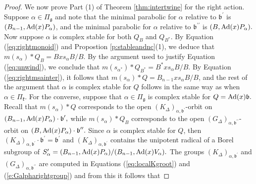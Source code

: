 \documentclass[12pt]{amsart}
\numberwithin{equation}{section}
\newcommand{\fk}{\mbox{${\mathfrak k}$}}
\newcommand{\fg}{\mbox{${\mathfrak g}$}}
\newcommand{\fb}{\mbox{${\mathfrak b}$}}
\newcommand{\Ad}{{\rm Ad}}
\newcommand{\ms}{m(s_{\alpha})}
\begin{document}
\begin{proof}
We now prove Part (1) of Theorem \ref{thm:intertwine} for the right action.  
Suppose $\alpha \in \Pi_{\fg}$ and note that the minimal parabolic for $\alpha$ relative to $\fb^{\prime}$ is $(B_{n-1},\Ad(x)P_{\alpha})$, and the minimal parabolic for $\alpha$ relative to $\fb^{\prime\prime}$ is $(B,\Ad(x)P_{\alpha}).$  
  Now suppose $\alpha$ is complex stable for both $Q_{B}$ and $Q_{B^{*}}$.   By Equation (\ref{eq:rightmonoid}) and Propostion \ref{p:stableandnc}(1), we deduce that $\ms*Q_B=Bxs_{\alpha}B/B$.   By the argument used to justify
Equation (\ref{eq:unwind}), we conclude that $m(s_{\alpha^{*}})*Q_{B^{*}}=B^{*}xs_{\alpha}B/B$.   By Equation (\ref{eq:rightmsainter}), it follows that 
$\ms*Q=B_{n-1}xs_{\alpha}B/B$, and the rest of the argument that $\alpha$ is complex stable for $Q$ follows in the same way as when $\alpha \in \Pi_{\fk}.$
For the converse, suppose that $\alpha\in\Pi_{\fg}$ is complex stable for $Q=\Ad(x)\fb.$ 
 Recall that $\ms*Q$ corresponds to the open $(K_{\Delta})_{\alpha, \fb^{\prime}}$-orbit on $(B_{n-1},\Ad(x)P_{\alpha})\cdot \fb^{\prime},$ while $\ms*Q_{B}$ corresponds to the open $(G_{\Delta})_{\alpha,\fb^{\prime\prime}}$-orbit on $(B,\Ad(x)P_{\alpha})\cdot\fb^{\prime\prime}.$
 Since $\alpha$ is complex stable for $Q$, then 
$(K_{\Delta})_{\alpha,\fb^{\prime}}\cdot \fb^{\prime}=\fb^{\prime}$ and
 $(K_{\Delta})_{\alpha,\fb^{\prime}}$ contains the unipotent radical of a Borel subgroup of $S_{\alpha}^{\prime}=(B_{n-1},\Ad(x)P_{\alpha})/(B_{n-1},\Ad(x)V_{\alpha}).$ 
The groups $(K_{\Delta})_{\alpha, \fb^{\prime}}$ and  $(G_{\Delta})_{\alpha, \fb^{\prime\prime}}$ are computed in Equations (\ref{eq:localKgroot}) and (\ref{e:Galpharightgroup}) and from this it follows that

\end{proof}
\end{document}

